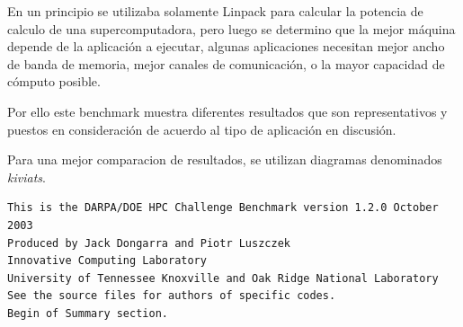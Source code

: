 \documentclass[a4paper]{report}
\begin{document}
En un principio se utilizaba solamente Linpack para calcular la potencia
de calculo de una supercomputadora, pero luego se determino que la mejor
m\'aquina depende de la aplicaci\'on a ejecutar, algunas aplicaciones
necesitan mejor ancho de banda de memoria, mejor canales de comunicaci\'on, o
la mayor capacidad de c\'omputo posible.

\bigskip

Por ello este benchmark muestra diferentes resultados que son representativos
y puestos en consideraci\'on de acuerdo al tipo de aplicaci\'on en discusi\'on.


Para una mejor comparacion de resultados, se utilizan diagramas denominados
{\it kiviats}.

\begin{verbatim}
This is the DARPA/DOE HPC Challenge Benchmark version 1.2.0 October 2003
Produced by Jack Dongarra and Piotr Luszczek
Innovative Computing Laboratory
University of Tennessee Knoxville and Oak Ridge National Laboratory
See the source files for authors of specific codes.
Begin of Summary section.
\end{verbatim}
\end{document}

